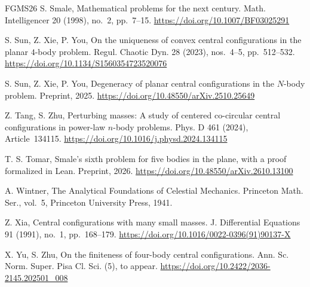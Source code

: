 \documentclass[Threeside,11pt]{article}
\theoremstyle{definition}
\theoremstyle{remark}
\numberwithin{equation}{section}
\theoremstyle{remark}
\begin{document}
\begin{thebibliography}{FGMS26}
S. Smale,
Mathematical problems for the next century.
Math. Intelligencer 20 (1998), no.~2, pp.~7--15.
\url{https://doi.org/10.1007/BF03025291}

S. Sun, Z. Xie, P. You,
On the uniqueness of convex central configurations in the planar $4$-body problem.
Regul. Chaotic Dyn. 28 (2023), nos.~4--5, pp.~512--532.
\url{https://doi.org/10.1134/S1560354723520076}

S. Sun, Z. Xie, P. You,
Degeneracy of planar central configurations in the $N$-body problem.
Preprint, 2025.
\url{https://doi.org/10.48550/arXiv.2510.25649}

Z. Tang, S. Zhu,
Perturbing masses: A study of centered co-circular central configurations in power-law $n$-body problems.
Phys. D 461 (2024), Article~134115.
\url{https://doi.org/10.1016/j.physd.2024.134115}

T. S. Tomar,
Smale's sixth problem for five bodies in the plane, with a proof
formalized in Lean.
Preprint, 2026.
\url{https://doi.org/10.48550/arXiv.2610.13100}

A. Wintner,
The Analytical Foundations of Celestial Mechanics.
Princeton Math. Ser., vol.~5, Princeton University Press, 1941.

Z. Xia,
Central configurations with many small masses.
J. Differential Equations 91 (1991), no.~1, pp.~168--179.
\url{https://doi.org/10.1016/0022-0396(91)90137-X}

X. Yu, S. Zhu,
On the finiteness of four-body central configurations.
Ann. Sc. Norm. Super. Pisa Cl. Sci. (5), to appear.
\url{https://doi.org/10.2422/2036-2145.202501_008}
\end{thebibliography}
\end{document}

